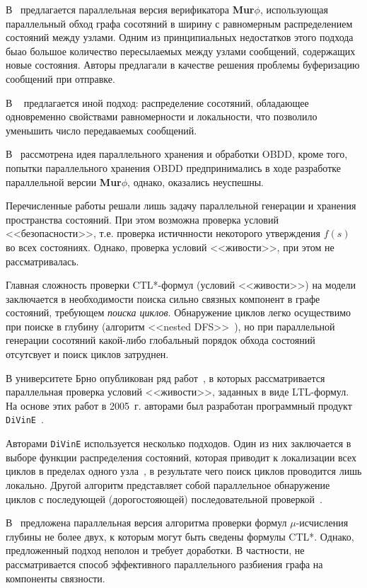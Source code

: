 \documentclass[a4paper,notitlepage,14pt]{article}
\begin{document}
В~\cite{Stern97parallelizingthe} предлагается параллельная версия верификатора
\textbf{Mur$\phi$}, использующая параллельный обход графа сосотяний в ширину с равномерным
распределением состояний между узлами. Одним из принципиальных недостатков этого подхода
быао большое количество пересылаемых между узлами сообщений, содержащих новые
состояния. Авторы предлагали в качестве решения проблемы буферизацию сообщений при
отправке.

В ~\cite{LS99} предлагается иной подход: распределение сосотяний, обладающее одновременно
свойствами равномерности и локальности, что позволило уменьшить число передаваемых
сообщений.

В~\cite{McMillan92} рассмотрена идея параллельного хранения и обработки OBDD, кроме того,
попытки параллельного хранения OBDD предпринимались в ходе разработке параллельной версии
\textbf{Mur$\phi$}, однако, оказались неуспешны.

Перечисленные работы решали лишь задачу параллельной генерации и хранения пространства
состояний. При этом возможна проверка условий <<безопасности>>, т.е. проверка истичнности
некоторого утверждения $f(s)$ во всех состояниях. Однако, проверка условий <<живости>>,
при этом не рассматривалась.

Главная сложность проверки CTL*-формул (условий <<живости>>) на модели заключается в
необходимости поиска сильно связных компонент в графе состояний, требующем \emph{поиска
  циклов}. Обнаружение циклов легко осуществимо при поиске в глубину (алгоритм <<nested
DFS>>~\cite{DBLP:conf/spin/FaragoS09}), но при параллельной генерации сосотяний какой-либо
глобальный порядок обхода состояний отсутсвует и поиск циклов затруднен.

В университете Брно опубликован ряд работ~\cite{DLTL1,DLTL2}, в которых рассматривается
параллельная проверка условий <<живости>>, заданных в виде LTL-формул. На основе этих
работ в 2005~г. авторами был разработан программный продукт \texttt{DiVinE}~\cite{DiVinE}.

Авторами \texttt{DiVinE} используется несколько подходов. Один из них заключается в выборе
функции распределения состояний, которая приводит к локализации всех циклов в пределах
одного узла~\cite{DLTL1}, в результате чего поиск циклов проводится лишь локально. Другой
алгоритм представляет собой параллельное обнаружение циклов с последующей (дорогостояющей)
последовательной проверкой~\cite{DLTL2}.

В~\cite{Leucker_parallelmodel} предложена параллельная версия алгоритма проверки формул
$\mu$-исчисления глубины не более двух, к которым могут быть сведены формулы CTL*. Однако,
предложенный подход неполон и требует доработки. В частности, не рассматривается способ
эффективного параллельного разбиения графа на компоненты связности.
\end{document}
